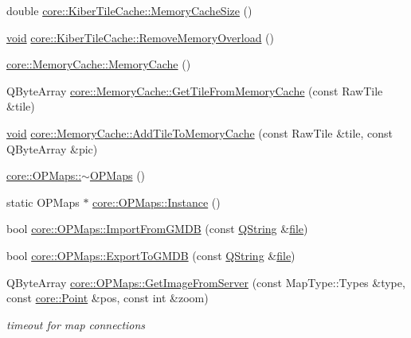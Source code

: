 \begin{DoxyCompactItemize}
\item 
double \hyperlink{group___o_p_map_widget_ga79164b194a65febe6f0b0f29fec3e002}{core\-::\-Kiber\-Tile\-Cache\-::\-Memory\-Cache\-Size} ()
\item 
\hyperlink{group___u_a_v_objects_plugin_ga444cf2ff3f0ecbe028adce838d373f5c}{void} \hyperlink{group___o_p_map_widget_ga7c3b50dd97465e188bb3e322b9717c5f}{core\-::\-Kiber\-Tile\-Cache\-::\-Remove\-Memory\-Overload} ()
\item 
\hyperlink{group___o_p_map_widget_gacf3985e0ad4b9b8ec8753ba08bbfe5d4}{core\-::\-Memory\-Cache\-::\-Memory\-Cache} ()
\item 
\-Q\-Byte\-Array \hyperlink{group___o_p_map_widget_ga7a264bbfd35c0236a10afa3c474e689b}{core\-::\-Memory\-Cache\-::\-Get\-Tile\-From\-Memory\-Cache} (const \-Raw\-Tile \&tile)
\item 
\hyperlink{group___u_a_v_objects_plugin_ga444cf2ff3f0ecbe028adce838d373f5c}{void} \hyperlink{group___o_p_map_widget_ga6a459355ac3d41deedd783f9bef0ada8}{core\-::\-Memory\-Cache\-::\-Add\-Tile\-To\-Memory\-Cache} (const \-Raw\-Tile \&tile, const \-Q\-Byte\-Array \&pic)
\item 
\hyperlink{group___o_p_map_widget_ga7f09b75dc945740e40b6c0fa28998c51}{core\-::\-O\-P\-Maps\-::$\sim$\-O\-P\-Maps} ()
\item 
static \-O\-P\-Maps $\ast$ \hyperlink{group___o_p_map_widget_ga20822cc13b7089e598c95023a90ed036}{core\-::\-O\-P\-Maps\-::\-Instance} ()
\item 
bool \hyperlink{group___o_p_map_widget_ga50b468c09bac4de46905661839aa2477}{core\-::\-O\-P\-Maps\-::\-Import\-From\-G\-M\-D\-B} (const \hyperlink{group___u_a_v_objects_plugin_gab9d252f49c333c94a72f97ce3105a32d}{\-Q\-String} \&\hyperlink{uavobjecttemplate_8m_a97c04efa65bcf0928abf9260bc5cbf46}{file})
\item 
bool \hyperlink{group___o_p_map_widget_ga0e08ede04e7f73ba867d870516a3da12}{core\-::\-O\-P\-Maps\-::\-Export\-To\-G\-M\-D\-B} (const \hyperlink{group___u_a_v_objects_plugin_gab9d252f49c333c94a72f97ce3105a32d}{\-Q\-String} \&\hyperlink{uavobjecttemplate_8m_a97c04efa65bcf0928abf9260bc5cbf46}{file})
\item 
\-Q\-Byte\-Array \hyperlink{group___o_p_map_widget_ga03e1a814248920f31520f38e2ed5d412}{core\-::\-O\-P\-Maps\-::\-Get\-Image\-From\-Server} (const \-Map\-Type\-::\-Types \&type, const \hyperlink{structcore_1_1_point}{core\-::\-Point} \&pos, const int \&zoom)
\begin{DoxyCompactList}\small\item\em timeout for map connections \end{DoxyCompactList}\item 

\end{DoxyCompactItemize}

